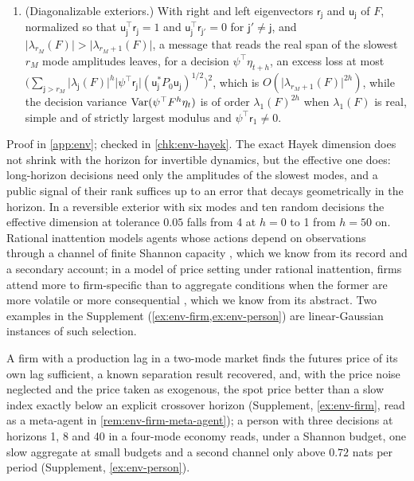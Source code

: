 \begin{theorem}
\begin{enumerate}
\item[(c)] (Diagonalizable exteriors.) With right and left eigenvectors $\mathsf r_{\mathsf j}$ and $\mathsf u_{\mathsf j}$ of $F$, normalized so that $\mathsf u_{\mathsf j}^\top\mathsf r_{\mathsf j}=1$ and $\mathsf u_{\mathsf j}^\top\mathsf r_{\mathsf j'}=0$ for $\mathsf j'\ne\mathsf j$, and $\lvert\lambda_{r_M}(F)\rvert>\lvert\lambda_{r_M+1}(F)\rvert$, a message that reads the real span of the slowest $r_M$ mode amplitudes leaves, for a decision $\psi^\top\eta_{t+h}$, an excess loss at most $\bigl(\sum_{\mathsf j>r_M}\lvert\lambda_{\mathsf j}(F)\rvert^h\lvert\psi^\top\mathsf r_{\mathsf j}\rvert(\mathsf u_{\mathsf j}^*P_0\mathsf u_{\mathsf j})^{1/2}\bigr)^2$, which is $O(\lvert\lambda_{r_M+1}(F)\rvert^{2h})$, while the decision variance $\operatorname{Var}(\psi^\top F^h\eta_t)$ is of order $\lambda_1(F)^{2h}$ when $\lambda_1(F)$ is real, simple and of strictly largest modulus and $\psi^\top\mathsf r_1\ne0$.
\end{enumerate}
\end{theorem}

Proof in \cref{app:env}; checked in \cref{chk:env-hayek}. The exact Hayek dimension does not shrink with the horizon for invertible dynamics, but the effective one does: long-horizon decisions need only the amplitudes of the slowest modes, and a public signal of their rank suffices up to an error that decays geometrically in the horizon. In a reversible exterior with six modes and ten random decisions the effective dimension at tolerance $0.05$ falls from 4 at $h=0$ to 1 from $h=50$ on. Rational inattention models agents whose actions depend on observations through a channel of finite Shannon capacity \citep{sims2003implications}, which we know from its record and a secondary account; in a model of price setting under rational inattention, firms attend more to firm-specific than to aggregate conditions when the former are more volatile or more consequential \citep{mackowiak2009optimal}, which we know from its abstract. Two examples in the Supplement (\cref{ex:env-firm,ex:env-person}) are linear-Gaussian instances of such selection.

A firm with a production lag in a two-mode market finds the futures price of its own lag sufficient, a known separation result recovered, and, with the price noise neglected and the price taken as exogenous, the spot price better than a slow index exactly below an explicit crossover horizon (Supplement, \cref{ex:env-firm}, read as a meta-agent in \cref{rem:env-firm-meta-agent}); a person with three decisions at horizons 1, 8 and 40 in a four-mode economy reads, under a Shannon budget, one slow aggregate at small budgets and a second channel only above $0.72$ nats per period (Supplement, \cref{ex:env-person}).

